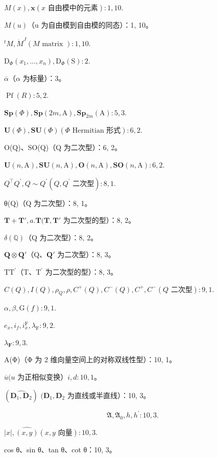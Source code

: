\(M(x), \mathbf{x} (x \text{ 自由模中的元素}) : 1, 10.\)

\(M(u)\)（u 为自由模到自由模的同态）：1, 10。

\(^{t}M, \dot{M}^{J} (M \text { matrix } ): 1, 10.\)

\(\mathrm{D}_{\Phi}(x_{1},\ldots ,x_{n}),\mathrm{D}_{\Phi}(\mathrm{S}):2.\)

\(\overline{\alpha}\)（\(\alpha\) 为标量）：3。

\(\operatorname{Pf}(R):5,2.\)

\(\mathbf{Sp}(\Phi), \mathbf{Sp}(2m, \mathrm{A}), \mathbf{Sp}_{2m}(\mathrm{A}) : 5, 3.\)

\(\mathbf{U}(\Phi), \mathbf{S}\mathbf{U}(\Phi) (\Phi \text{ Hermitian 形式}) : 6, 2.\)

O(Q)、SO(Q)（Q 为二次型）：6, 2。

\(\mathbf{U}(n,\mathrm{A}),\mathbf{S}\mathbf{U}(n,\mathrm{A}),\mathbf{O}(n,\mathrm{A}),\mathbf{SO}(n,\mathrm{A}):6,2.\)

\(Q^{\top}Q^{\prime}, Q \sim Q^{\prime}(Q, Q^{\prime}\text{ 二次型}): 8, 1.\)

θ(Q)（Q 为二次型）：8, 1。

\(\mathbf{T} + \mathbf{T}', a. \mathbf{T} (\mathbf{T}, \mathbf{T}'\) 为二次型的型）：8, 2。

\(\delta (\mathbb{Q})\)（Q 为二次型）：8, 2。

\(\mathbf{Q} \otimes \mathbf{Q}'\)（Q、\(\mathbf{Q}'\) 为二次型）：8, 3。

\(\mathrm{TT}^{\prime}\)（T、\(\mathrm{T}^{\prime}\) 为二次型的型）：8, 3。

\(C(Q), I(Q), \rho_{Q}, \rho, C^{+}(Q), C^{-}(Q), C^{+}, C^{-} (Q \text{ 二次型}): 9, 1.\)

\(\alpha, \beta, \mathrm{G}(f): 9, 1.\)

\(e_x, i_f, i_x^{\mathrm{F}}, \lambda_{\mathrm{F}}: 9, 2.\)

\(\lambda_{\mathbf{F}}:9,3.\)

A(Φ)（Φ 为 2 维向量空间上的对称双线性型）：10, 1。

\(\overline{u} (u\) 为正相似变换）\(i,d:10,1\)。

\((\widehat{\mathbf{D}_1,\mathbf{D}_2})\) \((\mathbf{D}_1,\mathbf{D}_2\) 为直线或半直线）：10, 3。

\[
\mathfrak {A}, \mathfrak {A} _ {0}, h, h ^ {\prime}: 1 0, 3.
\]

\(|x|, \widehat{(x,y)}(x,y\text{ 向量}):10,3.\)

cos θ、sin θ、tan θ、cot θ：10, 3。

